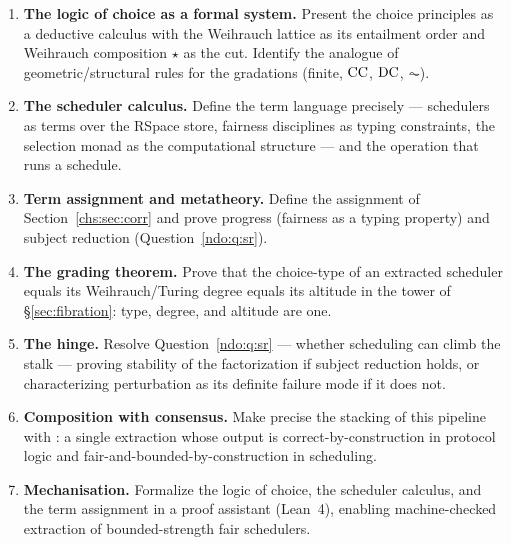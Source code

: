 \begin{enumerate}[label=P\arabic*.,leftmargin=2.4em]
\item \textbf{The logic of choice as a formal system.} Present the choice principles as a deductive calculus with
the Weihrauch lattice \cite{weihrauch} as its entailment order and Weihrauch composition $\star$ as the cut. Identify
the analogue of geometric/structural rules for the gradations (finite, $\mathrm{CC}$, $\mathrm{DC}$, $\AC$).
\item \textbf{The scheduler calculus.} Define the term language precisely --- schedulers as terms over the RSpace
store, fairness disciplines as typing constraints, the selection monad \cite{escardo} as the computational structure
--- and the operation that runs a schedule.
\item \textbf{Term assignment and metatheory.} Define the assignment of Section~\ref{chs:sec:corr} and prove progress
(fairness as a typing property) and subject reduction (Question~\ref{ndo:q:sr}).
\item \textbf{The grading theorem.} Prove that the choice-type of an extracted scheduler equals its
Weihrauch/Turing degree equals its altitude in the tower of \S\ref{sec:fibration}: type, degree, and altitude are one.
\item \textbf{The hinge.} Resolve Question~\ref{ndo:q:sr} --- whether scheduling can climb the stalk --- proving stability
of the factorization if subject reduction holds, or characterizing perturbation as its definite failure mode if it does
not.
\item \textbf{Composition with consensus.} Make precise the stacking of this pipeline with \cite{consensus}: a single
extraction whose output is correct-by-construction in protocol logic and fair-and-bounded-by-construction in scheduling.
\item \textbf{Mechanisation.} Formalize the logic of choice, the scheduler calculus, and the term assignment in a proof
assistant (Lean~4), enabling machine-checked extraction of bounded-strength fair schedulers.
\end{enumerate}

